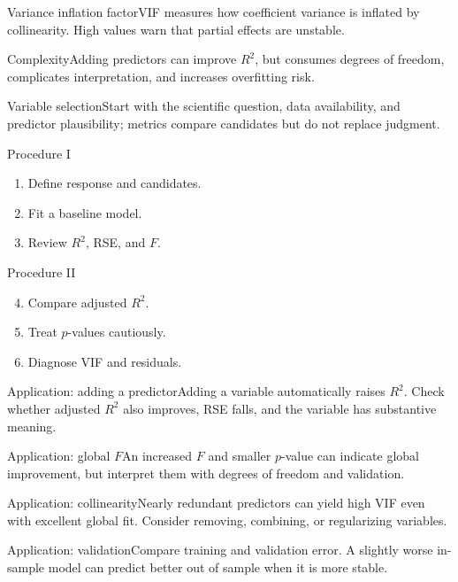 \documentclass[10pt,aspectratio=169]{beamer}
\begin{document}
\begin{frame}{Variance inflation factor}\small VIF measures how coefficient variance is inflated by collinearity. High values warn that partial effects are unstable.\end{frame}
\begin{frame}{Complexity}\small Adding predictors can improve $R^2$, but consumes degrees of freedom, complicates interpretation, and increases overfitting risk.\end{frame}
\begin{frame}{Variable selection}\small Start with the scientific question, data availability, and predictor plausibility; metrics compare candidates but do not replace judgment.\end{frame}
\begin{frame}{Procedure I}\small\begin{enumerate}\item Define response and candidates.\item Fit a baseline model.\item Review $R^2$, RSE, and $F$.\end{enumerate}\end{frame}
\begin{frame}{Procedure II}\small\begin{enumerate}\setcounter{enumi}{3}\item Compare adjusted $R^2$.\item Treat $p$-values cautiously.\item Diagnose VIF and residuals.\end{enumerate}\end{frame}
\begin{frame}{Application: adding a predictor}\small Adding a variable automatically raises $R^2$. Check whether adjusted $R^2$ also improves, RSE falls, and the variable has substantive meaning.\end{frame}
\begin{frame}{Application: global $F$}\small An increased $F$ and smaller $p$-value can indicate global improvement, but interpret them with degrees of freedom and validation.\end{frame}
\begin{frame}{Application: collinearity}\small Nearly redundant predictors can yield high VIF even with excellent global fit. Consider removing, combining, or regularizing variables.\end{frame}
\begin{frame}{Application: validation}\small Compare training and validation error. A slightly worse in-sample model can predict better out of sample when it is more stable.\end{frame}
\end{document}
